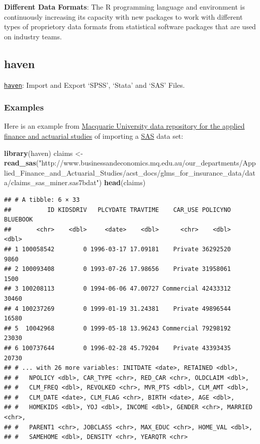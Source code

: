 \documentclass[]{book}
\newenvironment{Shaded}{\begin{snugshade}}{\end{snugshade}}
\newcommand{\KeywordTok}[1]{\textcolor[rgb]{0.13,0.29,0.53}{\textbf{{#1}}}}
\newcommand{\StringTok}[1]{\textcolor[rgb]{0.31,0.60,0.02}{{#1}}}
\newcommand{\NormalTok}[1]{{#1}}
\begin{document}
\textbf{Different Data Formats}: The R programming language and
environment is continuously increasing its capacity with new packages to
work with different types of proprietory data formats from statistical
software packages that are used on industry teams.

\subsection{\texorpdfstring{\textbf{haven }}{haven }}\label{haven}

\href{https://CRAN.R-project.org/package=haven}{\texttt{haven}}: Import
and Export `SPSS', `Stata' and `SAS' Files.

\subsubsection{\texorpdfstring{\textbf{Examples
}}{Examples }}\label{examples-9}

Here is an example from
\href{http://www.businessandeconomics.mq.edu.au/our_departments/Applied_Finance_and_Actuarial_Studies/research/books/GLMsforInsuranceData/data_sets}{Macquarie
University data repository for the applied finance and actuarial
studies} of importing a \href{http://www.sas.com/en_us/home.html}{SAS}
data set:

\begin{Shaded}
\begin{Highlighting}[]
\KeywordTok{library}\NormalTok{(haven)}
\NormalTok{claims <-}\StringTok{ }\KeywordTok{read_sas}\NormalTok{(}\StringTok{"http://www.businessandeconomics.mq.edu.au/our_departments/Applied_Finance_and_Actuarial_Studies/acst_docs/glms_for_insurance_data/data/claims_sas_miner.sas7bdat"}\NormalTok{)}
\KeywordTok{head}\NormalTok{(claims)}
\end{Highlighting}
\end{Shaded}

\begin{verbatim}
## # A tibble: 6 × 33
##          ID KIDSDRIV   PLCYDATE TRAVTIME    CAR_USE POLICYNO BLUEBOOK
##       <chr>    <dbl>     <date>    <dbl>      <chr>    <dbl>    <dbl>
## 1 100058542        0 1996-03-17 17.09181    Private 36292520     9860
## 2 100093408        0 1993-07-26 17.98656    Private 31958061     1500
## 3 100208113        0 1994-06-06 47.00727 Commercial 42433312    30460
## 4 100237269        0 1999-01-19 31.24381    Private 49896544    16580
## 5  10042968        0 1999-05-18 13.96243 Commercial 79298192    23030
## 6 100737644        0 1996-02-28 45.79204    Private 43393435    20730
## # ... with 26 more variables: INITDATE <date>, RETAINED <dbl>,
## #   NPOLICY <dbl>, CAR_TYPE <chr>, RED_CAR <chr>, OLDCLAIM <dbl>,
## #   CLM_FREQ <dbl>, REVOLKED <chr>, MVR_PTS <dbl>, CLM_AMT <dbl>,
## #   CLM_DATE <date>, CLM_FLAG <chr>, BIRTH <date>, AGE <dbl>,
## #   HOMEKIDS <dbl>, YOJ <dbl>, INCOME <dbl>, GENDER <chr>, MARRIED <chr>,
## #   PARENT1 <chr>, JOBCLASS <chr>, MAX_EDUC <chr>, HOME_VAL <dbl>,
## #   SAMEHOME <dbl>, DENSITY <chr>, YEARQTR <chr>
\end{verbatim}
\end{document}
